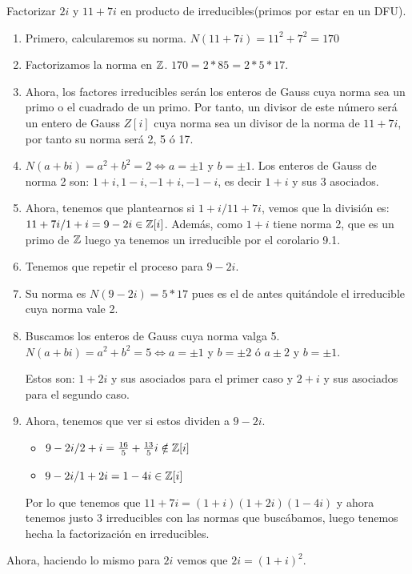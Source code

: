 \begin{ejemplo}
	Factorizar $2i$ y $11+7i$ en producto de irreducibles(primos por estar en un DFU).

	\begin{enumerate}
	\item Primero, calcularemos su norma. $N(11+7i) = 11^2 + 7^2 = 170$
	\item Factorizamos la norma en $\mathbb{Z}$. $170 = 2*85 = 2*5 *17$.
	\item Ahora, los factores irreducibles serán los enteros de Gauss cuya norma sea un primo o el cuadrado de un primo. Por tanto, un divisor de este número será un entero de Gauss $Z[i]$ cuya norma sea un divisor de la norma de $11+7i$, por tanto su norma será 2, 5 ó 17.
	\item  $N(a+bi) = a^2 +b^2 = 2 \iff a=\pm 1$ y $b= \pm 1.$ Los enteros de Gauss de norma 2 son: $1+i,1-i,-1+i,-1-i$, es decir $1+i$ y sus 3 asociados.
	\item Ahora, tenemos que plantearnos si $1+i / 11+7i$, vemos que la división es: $11+7i/1+i = 9-2i\in \mathbb{Z}[i]$. Además, como $1+i$ tiene norma 2, que es un primo de $\mathbb{Z}$ luego ya tenemos un irreducible por el corolario 9.1.
	\item Tenemos que repetir el proceso para $9-2i$.
	\item Su norma es $N(9-2i) = 5*17$ pues es el de antes quitándole el irreducible cuya norma vale 2.
	\item Buscamos los enteros de Gauss cuya norma valga 5. $N(a+bi) = a^2 +b^2 = 5 \iff a = \pm 1$ y $b =\pm 2$ ó $a \pm 2$ y $b = \pm 1$.

	Estos son: $1+2i$ y sus asociados para el primer caso y $2+i$ y sus asociados para el segundo caso.

	\item Ahora, tenemos que ver si estos dividen a $9-2i$.
	\begin{itemize}
	\item $9-2i/2+i  = \frac{16}{5} + \frac{13}{5}i \notin \mathbb{Z}[i]$
	\item $9-2i /1+2i = 1-4i \in \mathbb{Z}[i]$
\end{itemize}

Por lo que tenemos que $11+7i = (1+i)(1+2i)(1-4i)$ y ahora tenemos justo 3 irreducibles con las normas que buscábamos, luego tenemos hecha la factorización en irreducibles.

\end{enumerate}

Ahora, haciendo lo mismo para $2i$ vemos que $2i = (1+i)^2$.


\end{ejemplo}
